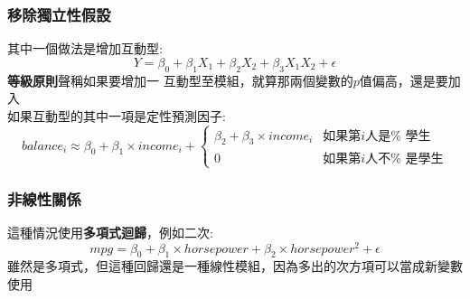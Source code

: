 \documentclass{report} %
\begin{document}
      \subsubsection{移除獨立性假設}
        其中一個做法是增加互動型:
        \begin{equation}
          Y = \beta_0 + \beta_1 X_1 + \beta_2 X_2 + \beta_3 X_1 X_2
            + \epsilon
        \end{equation}
        {\bf 等級原則}聲稱如果要增加一
          互動型至模組，就算那兩個變數的$p$值偏高，還是要加入\\
        如果互動型的其中一項是定性預測因子:
        \begin{equation}
          balance_i \approx \beta_0 + \beta_1 \times income_i +
          \left\{
            \begin{array}{ll}
              \beta_2 + \beta_3 \times income_i & \mbox{如果第$i$人是%
                                                    學生} \\
              0                                 & \mbox{如果第$i$人不%
                                                    是學生}
            \end{array}
          \right.
        \end{equation}
      \subsubsection{非線性關係}
        這種情況使用{\bf 多項式迴歸}，例如二次:
        \begin{equation}
          mpg = \beta_0 + \beta_1 \times horsepower + \beta_2 \times
            horsepower ^ 2 + \epsilon
        \end{equation}
        雖然是多項式，但這種回歸還是一種線性模組，因為多出的次方項可以當成新變數
          使用
\end{document}
